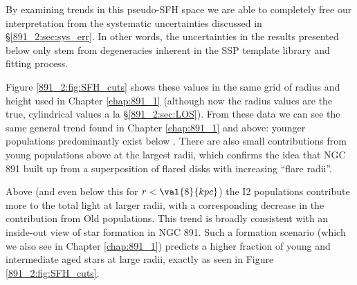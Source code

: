 By examining trends in this pseudo-SFH space we are able to completely
free our interpretation from the systematic uncertainties discussed in
\S\ref{891_2:sec:sys_err}. In other words, the uncertainties in the
results presented below only stem from degeneracies inherent in the
SSP template library and fitting process.

Figure \ref{891_2:fig:SFH_cuts} shows these values in the same grid of
radius and height used in Chapter \ref{chap:891_1} (although now the
radius values are the true, cylindrical values a la
\S\ref{891_2:sec:LOS}). From these data we can see the same general
trend found in Chapter \ref{chap:891_1} and above: younger populations
predominantly exist below . There are also small
contributions from young populations above  at the
largest radii, which confirms the idea that NGC 891 built up from a
superposition of flared disks with increasing ``flare radii''.

Above  (and even below this for $r < \val{8}{kpc}$) the
I2 populations contribute more to the total light at larger radii,
with a corresponding decrease in the contribution from Old
populations. This trend is broadly consistent with an inside-out view
of star formation in NGC 891. Such a formation scenario (which we also
see in Chapter \ref{chap:891_1}) predicts a higher fraction of young
and intermediate aged stars at large radii, exactly as seen in Figure
\ref{891_2:fig:SFH_cuts}.




